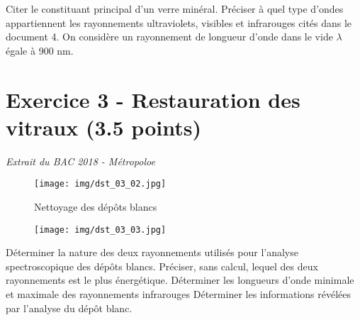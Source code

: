 \documentclass[answers]{exam}
\begin{document}
\begin{questions}
  \question[0.5] Citer le constituant principal d'un verre minéral.
  \question[0.5] Préciser à quel type d'ondes appartiennent les rayonnements ultraviolets, visibles et infrarouges cités dans le document 4.
  \question[4] On considère un rayonnement de longueur d'onde dans le vide $\lambda$ égale à 900 nm.
\end{questions}

\section*{Exercice 3 - Restauration des vitraux (3.5 points)}

  \textit{Extrait du BAC 2018 - Métropoloe}

\begin{figure}[H]
  \centering
  \texttt{[image: img/dst\_03\_02.jpg]}
  \caption{Nettoyage des dépôts blancs}
\end{figure}

\begin{figure}[H]
  \centering
  \texttt{[image: img/dst\_03\_03.jpg]}
\end{figure}


\begin{questions}
  \question[0.5] Déterminer la nature des deux rayonnements utilisés pour l'analyse spectroscopique des dépôts blancs.
  \question[1] Préciser, sans calcul, lequel des deux rayonnements est le plus énergétique.
  \question[1] Déterminer les longueurs d'onde minimale et maximale des rayonnements infrarouges
  \question[1] Déterminer les informations révélées par l'analyse du dépôt blanc.
\end{questions}
\end{document}
